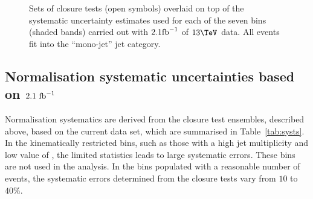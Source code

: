 \clearpage 
\begin{figure}[h!]
  \begin{center}
    \caption{Sets of closure tests (open symbols) overlaid on top of
      the systematic uncertainty estimates used for each of the seven
      \scalht bins (shaded bands) carried out with $2.1\text{fb}^{-1}$ of
      $13\tev$ data. All events fit into the ``mono-jet'' jet
      category.}
    \label{fig:closureDataMono}
  \end{center} 
\end{figure}

\clearpage
\subsection{Normalisation systematic uncertainties based on $2.1~\text{fb}^{-1}$}
\label{sec:closure-test-syst}

Normalisation systematics are derived from the closure test ensembles,
described above, based on the current data set, which are summarised
in Table~\ref{tab:systs}. In the kinematically restricted bins, such
as those with a high jet multiplicity and low value of \scalht, the
limited statistics leads to large systematic errors. These bins are
not used in the analysis. 
In the bins populated with a reasonable number of events, the
systematic errors determined from the closure tests vary from $10$ to
$40\%$.

